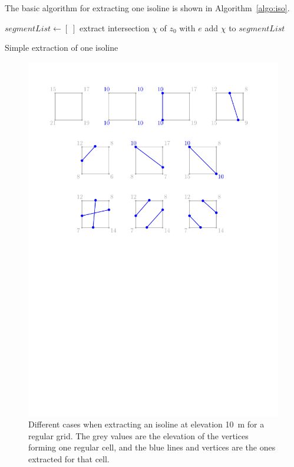 %

The basic algorithm for extracting one isoline is shown in Algorithm~\ref{algo:iso}.
\begin{algorithm}[tb] 
  $segmentList \leftarrow [\;]$ \;
  {
    {
      extract intersection $\chi$ of $z_0$ with $e$\;
      add $\chi$ to $segmentList$\;
    }
  }
  \caption{Simple extraction of one isoline}%
\label{algo:iso}
\end{algorithm} 
\begin{figure}
  \centering
  \includegraphics[width=0.95\linewidth]{figs/isoline-square}
\caption{Different cases when extracting an isoline at elevation \qty{10}{\m} for a regular grid. The grey values are the elevation of the vertices forming one regular cell, and the blue lines and vertices are the ones extracted for that cell.}%
\label{fig:rasterconfs}
\end{figure}
